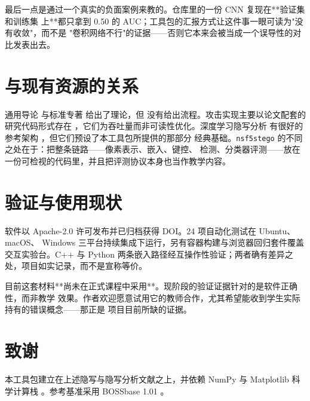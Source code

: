 \documentclass[11pt,a4paper,fontset=windows]{ctexart}
\begin{document}
最后一点是通过一个真实的负面案例来教的。仓库里的一份 CNN 复现在**验证集和训练集
上**都只拿到 0.50 的 AUC；工具包的汇报方式让这件事一眼可读为"没有收敛"，而不是
"卷积网络不行"的证据——否则它本来会被当成一个误导性的对比发表出去。

\section*{与现有资源的关系}

通用导论 \citep{provos2003hide} 与标准专著 \citep{fridrich2009book} 给出了理论，但
没有给出流程。攻击实现主要以论文配套的研究代码形式存在
\citep{pevny2010spam,fridrich2012rich}，它们为吞吐量而非可读性优化。深度学习隐写分析
有很好的参考架构 \citep{xu2016xunet,ye2017yenet}，但它们预设了本工具包所提供的那部分
经典基础。\texttt{nsf5stego} 的不同之处在于：把整条链路——像素表示、嵌入、键控、
检测、分类器评测——放在一份可检视的代码里，并且把评测协议本身也当作教学内容。

\section*{验证与使用现状}

软件以 Apache-2.0 许可发布并已归档获得 DOI。24 项自动化测试在 Ubuntu、macOS、
Windows 三平台持续集成下运行，另有容器构建与浏览器回归套件覆盖交互实验台。C++ 与
Python 两条嵌入路径经互操作性验证；两者确有差异之处，项目如实记录，而不是宣称等价。

目前这套材料**尚未在正式课程中采用**。现阶段的验证证据针对的是软件正确性，而非教学
效果。作者欢迎愿意试用它的教师合作，尤其希望能收到学生实际持有的错误概念——那正是
项目目前所缺的证据。

\section*{致谢}

本工具包建立在上述隐写与隐写分析文献之上，并依赖 NumPy 与 Matplotlib 科学计算栈
\citep{harris2020numpy}。参考基准采用 BOSSbase 1.01 \citep{bas2011boss}。



\end{document}
